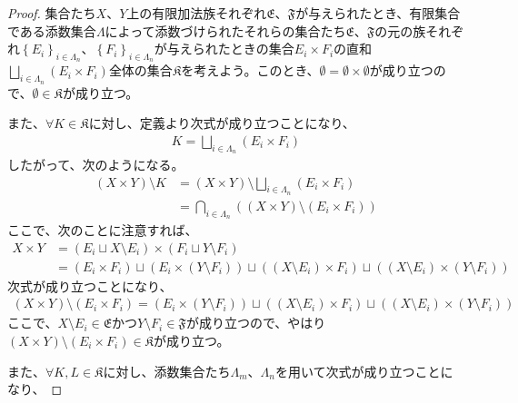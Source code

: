 \documentclass[dvipdfmx]{jsarticle}
\begin{document}
\begin{proof}
集合たち$X$、$Y$上の有限加法族それぞれ$\mathfrak{E}$、$\mathfrak{F}$が与えられたとき、有限集合である添数集合$\varLambda$によって添数づけられたそれらの集合たち$\mathfrak{E}$、$\mathfrak{F}$の元の族それぞれ$\left\{ E_{i} \right\}_{i \in \varLambda_{n}}$、$\left\{ F_{i} \right\}_{i \in \varLambda_{n}}$が与えられたときの集合$E_{i} \times F_{i}$の直和$\bigsqcup_{i \in \varLambda_{n}} \left( E_{i} \times F_{i} \right)$全体の集合$\mathfrak{K}$を考えよう。このとき、$\emptyset = \emptyset \times \emptyset$が成り立つので、$\emptyset \in \mathfrak{K}$が成り立つ。\par
また、$\forall K \in \mathfrak{K}$に対し、定義より次式が成り立つことになり、
\begin{align*}
K = \bigsqcup_{i \in \varLambda_{n}} \left( E_{i} \times F_{i} \right)
\end{align*}
したがって、次のようになる。
\begin{align*}
(X \times Y) \setminus K &= (X \times Y) \setminus \bigsqcup_{i \in \varLambda_{n}} \left( E_{i} \times F_{i} \right)\\
&= \bigcap_{i \in \varLambda_{n}} \left( (X \times Y) \setminus \left( E_{i} \times F_{i} \right) \right)
\end{align*}
ここで、次のことに注意すれば、
\begin{align*}
X \times Y &= \left( E_{i} \sqcup X \setminus E_{i} \right) \times \left( F_{i} \sqcup Y \setminus F_{i} \right)\\
&= \left( E_{i} \times F_{i} \right) \sqcup \left( E_{i} \times \left( Y \setminus F_{i} \right) \right) \sqcup \left( \left( X \setminus E_{i} \right) \times F_{i} \right) \sqcup \left( \left( X \setminus E_{i} \right) \times \left( Y \setminus F_{i} \right) \right)
\end{align*}
次式が成り立つことになり、
\begin{align*}
(X \times Y) \setminus \left( E_{i} \times F_{i} \right) = \left( E_{i} \times \left( Y \setminus F_{i} \right) \right) \sqcup \left( \left( X \setminus E_{i} \right) \times F_{i} \right) \sqcup \left( \left( X \setminus E_{i} \right) \times \left( Y \setminus F_{i} \right) \right)
\end{align*}
ここで、$X \setminus E_{i}\in \mathfrak{E}$かつ$Y \setminus F_{i}\in \mathfrak{F}$が成り立つので、やはり$(X \times Y) \setminus \left( E_{i} \times F_{i} \right) \in \mathfrak{K}$が成り立つ。\par
また、$\forall K,L \in \mathfrak{K}$に対し、添数集合たち$\varLambda_{m}$、$\varLambda_{n}$を用いて次式が成り立つことになり、

\end{proof}
\end{document}
